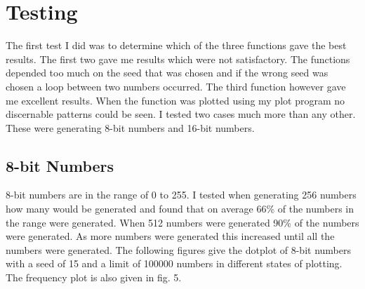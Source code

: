 \documentclass[a4paper,11pt,titlepage]{article}
\begin{document}
\section{Testing}
The first test I did was to determine which of the three functions gave the best results. The first two gave me results which were not satisfactory. The functions depended too much on the seed that was chosen and if the wrong seed was chosen a loop between two numbers occurred. The third function however gave me excellent results. When the function was plotted using my plot program no discernable patterns could be seen. I tested two cases much more than any other. These were generating 8-bit numbers and 16-bit numbers.
\subsection{8-bit Numbers}
8-bit numbers are in the range of 0 to 255. I tested when generating 256 numbers how many would be generated and found that on average 66\% of the numbers in the range were generated. When 512 numbers were generated 90\% of the numbers were generated. As more numbers were generated this increased until all the numbers were generated. The following figures give the dotplot of 8-bit numbers with a seed of 15 and a limit of 100000 numbers in different states of plotting. The frequency plot is also given in fig. 5.
\end{document}
